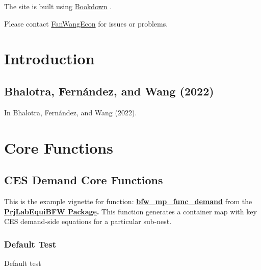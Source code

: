 \documentclass[
]{book}
\begin{document}
The site is built using \href{https://bookdown.org/}{Bookdown} \citep{R-bookdown}.

Please contact \href{https://fanwangecon.github.io/}{FanWangEcon} for issues or problems.

\hypertarget{introduction}{%
\chapter{Introduction}\label{introduction}}

\hypertarget{bhalotra-fernuxe1ndez-and-wang-2022}{%
\section{Bhalotra, Fernández, and Wang (2022)}\label{bhalotra-fernuxe1ndez-and-wang-2022}}

In Bhalotra, Fernández, and Wang (2022).

\hypertarget{core-functions}{%
\chapter{Core Functions}\label{core-functions}}

\hypertarget{ces-demand-core-functions}{%
\section{CES Demand Core Functions}\label{ces-demand-core-functions}}

This is the example vignette for function:
\href{https://github.com/FanWangEcon/PrjLabEquiBFW/tree/main/PrjLabEquiBFW/func/bfw_mp_func_demand.m}{\textbf{bfw\_mp\_func\_demand}}
from the \href{https://fanwangecon.github.io/PrjLabEquiBFW/}{\textbf{PrjLabEquiBFW
Package}}\textbf{.} This
function generates a container map with key CES demand-side equations
for a particular sub-nest.

\hypertarget{default-test}{%
\subsection{Default Test}\label{default-test}}

Default test
\end{document}
